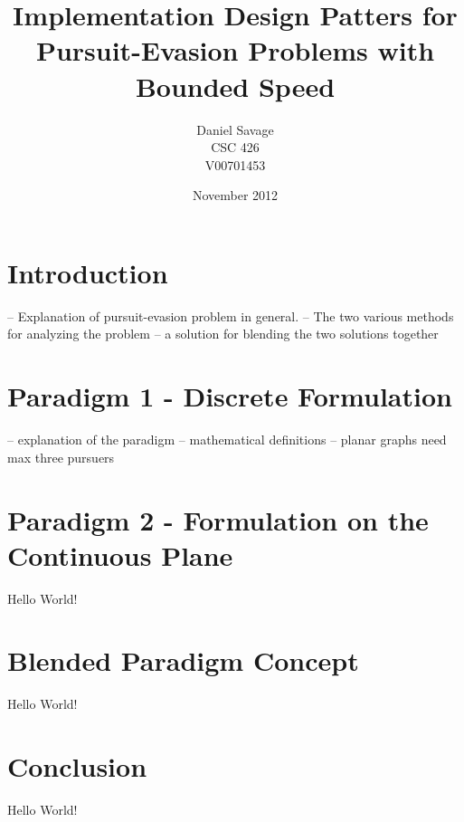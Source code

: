 \documentclass{article}
\begin{document}
\title{Implementation Design Patters for Pursuit-Evasion Problems with Bounded Speed}
\author{Daniel Savage\\CSC 426\\{V00701453}}
\date{November 2012}
\maketitle
\pagebreak

\section{Introduction}
-- Explanation of pursuit-evasion problem in general.
-- The two various methods for analyzing the problem
-- a solution for blending the two solutions together

\section{Paradigm 1 - Discrete Formulation}
-- explanation of the paradigm
-- mathematical definitions
-- planar graphs need max three pursuers

\section{Paradigm 2 - Formulation on the Continuous Plane}
Hello World!

\section{Blended Paradigm Concept}
Hello World!

\section{Conclusion}
Hello World!
\end{document}
